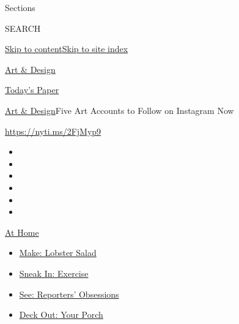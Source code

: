 Sections

SEARCH

\protect\hyperlink{site-content}{Skip to
content}\protect\hyperlink{site-index}{Skip to site index}

\href{https://www.nytimes3xbfgragh.onion/section/arts/design}{Art \&
Design}

\href{https://myaccount.nytimes3xbfgragh.onion/auth/login?response_type=cookie\&client_id=vi}{}

\href{https://www.nytimes3xbfgragh.onion/section/todayspaper}{Today's
Paper}

\href{/section/arts/design}{Art \& Design}\textbar{}Five Art Accounts to
Follow on Instagram Now

\url{https://nyti.ms/2FjMyp9}

\begin{itemize}
\item
\item
\item
\item
\item
\item
\end{itemize}

\href{https://www.nytimes3xbfgragh.onion/spotlight/at-home?action=click\&pgtype=Article\&state=default\&region=TOP_BANNER\&context=at_home_menu}{At
Home}

\begin{itemize}
\tightlist
\item
  \href{https://www.nytimes3xbfgragh.onion/2020/08/14/dining/lobster-salad-recipe.html?action=click\&pgtype=Article\&state=default\&region=TOP_BANNER\&context=at_home_menu}{Make:
  Lobster Salad}
\item
  \href{https://www.nytimes3xbfgragh.onion/2020/08/15/at-home/coronavirus-at-home-quick-exercises.html?action=click\&pgtype=Article\&state=default\&region=TOP_BANNER\&context=at_home_menu}{Sneak
  In: Exercise}
\item
  \href{https://www.nytimes3xbfgragh.onion/interactive/2020/at-home/even-more-reporters-editors-diaries-lists-recommendations.html?action=click\&pgtype=Article\&state=default\&region=TOP_BANNER\&context=at_home_menu}{See:
  Reporters' Obsessions}
\item
  \href{https://www.nytimes3xbfgragh.onion/2020/08/15/at-home/coronavirus-fall-patio-furniture.html?action=click\&pgtype=Article\&state=default\&region=TOP_BANNER\&context=at_home_menu}{Deck
  Out: Your Porch}
\end{itemize}

